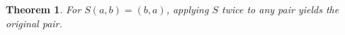 \documentclass{article}
\newtheorem{theorem}{Theorem}
\begin{document}
\begin{theorem}\label{thm:R01}
For $S(a,b)=(b,a)$, applying $S$ twice to any pair yields the original pair.
\end{theorem}
\end{document}
